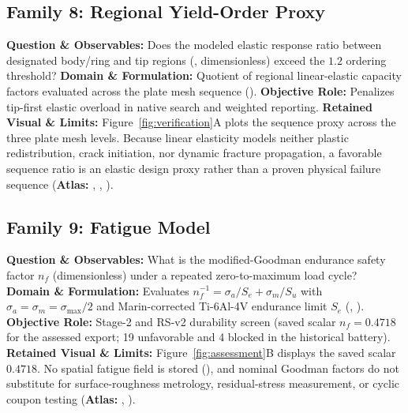 \subsection{Family 8: Regional Yield-Order Proxy}
\label{subsec:family-sequence}
\textbf{Question \& Observables:} Does the modeled elastic response ratio between designated body/ring and tip regions (, dimensionless) exceed the $1.2$ ordering threshold?
\textbf{Domain \& Formulation:} Quotient of regional linear-elastic capacity factors evaluated across the plate mesh sequence ().
\textbf{Objective Role:} Penalizes tip-first elastic overload in native search and weighted reporting.
\textbf{Retained Visual \& Limits:} Figure~\ref{fig:verification}A plots the sequence proxy across the three plate mesh levels. Because linear elasticity models neither plastic redistribution, crack initiation, nor dynamic fracture propagation, a favorable sequence ratio is an elastic design proxy rather than a proven physical failure sequence (\textbf{Atlas:} , , ).

\subsection{Family 9: Fatigue Model}
\label{subsec:family-fatigue}
\textbf{Question \& Observables:} What is the modified-Goodman endurance safety factor $n_f$ (dimensionless) under a repeated zero-to-maximum load cycle?
\textbf{Domain \& Formulation:} Evaluates $n_f^{-1} = \sigma_a / S_e + \sigma_m / S_u$ with $\sigma_a = \sigma_m = \sigma_{\max}/2$ and Marin-corrected Ti-6Al-4V endurance limit $S_e$ (, ).
\textbf{Objective Role:} Stage-2 and RS-v2 durability screen (saved scalar $n_f = 0.4718$ for the assessed export; 19 unfavorable and 4 blocked in the historical battery).
\textbf{Retained Visual \& Limits:} Figure~\ref{fig:assessment}B displays the saved scalar $0.4718$. No spatial fatigue field is stored (), and nominal Goodman factors do not substitute for surface-roughness metrology, residual-stress measurement, or cyclic coupon testing (\textbf{Atlas:} , ).

